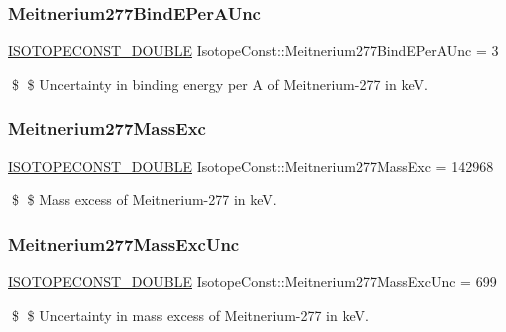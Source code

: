 \subsubsection{\texorpdfstring{Meitnerium277\+Bind\+E\+Per\+A\+Unc}{Meitnerium277BindEPerAUnc}}
{\footnotesize\ttfamily \mbox{\hyperlink{group___isotope_const-_macros_ga8f45a7272ce02c0b4c65c44636ed719a}{I\+S\+O\+T\+O\+P\+E\+C\+O\+N\+S\+T\+\_\+\+D\+O\+U\+B\+LE}} Isotope\+Const\+::\+Meitnerium277\+Bind\+E\+Per\+A\+Unc = 3}

\$ \$ Uncertainty in binding energy per A of Meitnerium-\/277 in keV. \mbox{\label{group___isotope_const-_meitnerium-_mt277_ga52220ae975ef14a5dbdaed024a88e024}} 
\subsubsection{\texorpdfstring{Meitnerium277\+Mass\+Exc}{Meitnerium277MassExc}}
{\footnotesize\ttfamily \mbox{\hyperlink{group___isotope_const-_macros_ga8f45a7272ce02c0b4c65c44636ed719a}{I\+S\+O\+T\+O\+P\+E\+C\+O\+N\+S\+T\+\_\+\+D\+O\+U\+B\+LE}} Isotope\+Const\+::\+Meitnerium277\+Mass\+Exc = 142968}

\$ \$ Mass excess of Meitnerium-\/277 in keV. \mbox{\label{group___isotope_const-_meitnerium-_mt277_ga1ed00fbd4d3d7fa21a35946019124cd2}} 
\subsubsection{\texorpdfstring{Meitnerium277\+Mass\+Exc\+Unc}{Meitnerium277MassExcUnc}}
{\footnotesize\ttfamily \mbox{\hyperlink{group___isotope_const-_macros_ga8f45a7272ce02c0b4c65c44636ed719a}{I\+S\+O\+T\+O\+P\+E\+C\+O\+N\+S\+T\+\_\+\+D\+O\+U\+B\+LE}} Isotope\+Const\+::\+Meitnerium277\+Mass\+Exc\+Unc = 699}

\$ \$ Uncertainty in mass excess of Meitnerium-\/277 in keV. \mbox{\label{group___isotope_const-_meitnerium-_mt277_ga4ed3d1456b2e34e0d5b4c92f30fd8285}} 

